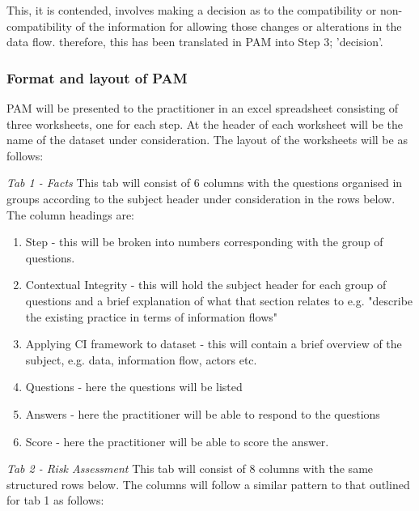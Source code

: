 This, it is contended, %
 involves making a decision as to the compatibility or non-compatibility of the information for allowing those changes or alterations in the data flow. therefore, this has been translated in PAM into Step 3; 'decision'. 

\subsubsection{Format and layout of PAM}

PAM will be presented to the practitioner in an excel spreadsheet consisting of three worksheets, one for each step. %
At the header of each worksheet will be the name of the dataset under consideration. The layout of the worksheets will be as follows:

{\it Tab 1 - Facts}
This tab will consist of 6 columns with the questions organised in groups according to the subject header under consideration in the rows below. The column headings are:

\begin{enumerate}
\item Step - this will be broken into numbers corresponding with the group of questions. 
\item Contextual Integrity - this will hold the subject header for each group of questions and a brief explanation of what that section relates to e.g. "describe the existing practice in terms of information flows" 
\item Applying CI framework to dataset - this will contain a brief overview of the subject, e.g. data, information flow, actors etc.
\item Questions - here the questions will be listed
\item Answers - here the practitioner will be able to respond to the questions
\item Score - here the practitioner will be able to score the answer.
\end {enumerate}

{\it Tab 2 - Risk Assessment}
This tab will consist of 8 columns with the same structured rows below. The columns will follow a similar pattern to that outlined for tab 1 as follows:


